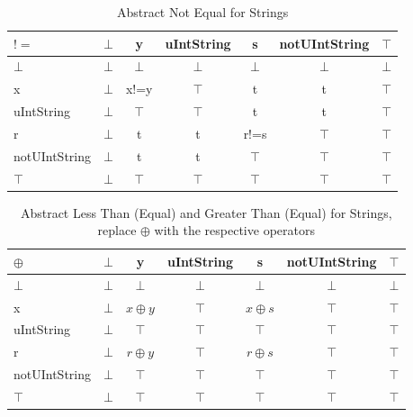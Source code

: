 \begin{table}[htbp]
\centering
\begin{tabular}{l|cccccc}
$!=$          & $\bot$ & y      & uIntString & s      & notUIntString & $\top$ \\\hline
$\bot$        & $\bot$ & $\bot$ & $\bot$     & $\bot$ & $\bot$        & $\bot$ \\
x             & $\bot$ & x!=y   & $\top$     & t      & t             & $\top$ \\
uIntString    & $\bot$ & $\top$ & $\top$     & t      & t             & $\top$ \\
r             & $\bot$ & t      & t          & r!=s   & $\top$        & $\top$ \\
notUIntString & $\bot$ & t      & t          & $\top$ & $\top$        & $\top$ \\
$\top$        & $\bot$ & $\top$ & $\top$     & $\top$ & $\top$        & $\top$
\end{tabular}
\caption{Abstract Not Equal for Strings}
\label{tab:abstract_not_equal_string}
\end{table}

\begin{table}[htbp]
\centering
\begin{tabular}{l|cccccc}
$\oplus$           & $\bot$ & y      & uIntString & s      & notUIntString & $\top$ \\\hline
$\bot$        & $\bot$ & $\bot$ & $\bot$     & $\bot$ & $\bot$        & $\bot$ \\
x             & $\bot$ & $x\oplus y$ & $\top$     & $x\oplus s$    & $\top$        & $\top$ \\
uIntString    & $\bot$ & $\top$ & $\top$     & $\top$ & $\top$        & $\top$ \\
r             & $\bot$ & $r\oplus y$    & $\top$     & $r\oplus s$    & $\top$        & $\top$ \\
notUIntString & $\bot$ & $\top$ & $\top$     & $\top$ & $\top$        & $\top$ \\
$\top$        & $\bot$ & $\top$ & $\top$     & $\top$ & $\top$        & $\top$
\end{tabular}
\caption{Abstract Less Than (Equal) and Greater Than (Equal) for Strings, replace $\oplus$ with the respective operators}
\label{tab:abstract_less_than_string}
\end{table}

